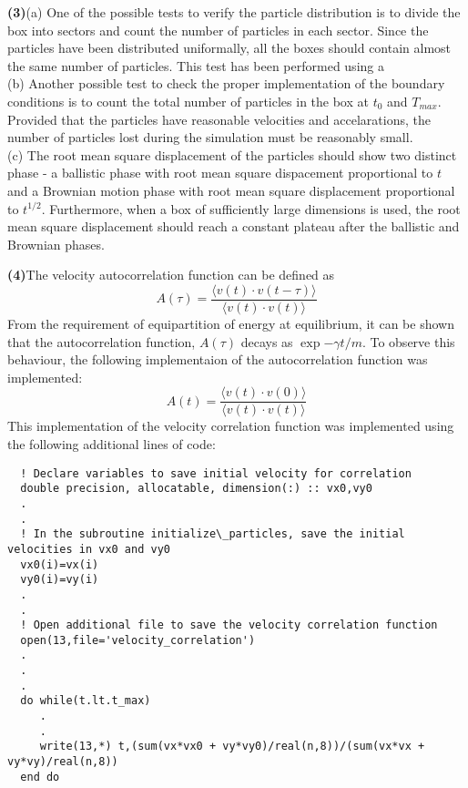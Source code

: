 \documentclass[11pt, oneside]{article}
\begin{document}
\textbf{(3)}\quad (a) One of the possible tests to verify the particle distribution is to divide the box into sectors and count the number of particles in each sector. Since the particles have been distributed uniformally, all the boxes should contain almost the same number of particles. This test has been performed using a \\
(b) Another possible test to check the proper implementation of the boundary conditions is to count the total number of particles in the box at \(t_0\) and \(T_{max}\). Provided that the particles have reasonable velocities and accelarations, the number of particles lost during the simulation must be reasonably small.\\ (c) The root mean square displacement of the particles should show two distinct phase - a ballistic phase with root mean square dispacement proportional to \(t\) and a Brownian motion phase with root mean square displacement proportional to \(t^{1/2}\). Furthermore, when a box of sufficiently large dimensions is used, the root mean square displacement should reach a constant plateau after the ballistic and Brownian phases.     

\textbf{(4)}\quad The velocity autocorrelation function can be defined as
\[A(\tau) = \frac{\langle v(t) \cdot v(t-\tau) \rangle}{\langle v(t) \cdot v(t) \rangle}\]
  From the requirement of equipartition of energy at equilibrium, it can be shown that the autocorrelation function, \(A(\tau)\) decays as \(\exp{-\gamma t / m}\). To observe this behaviour, the following implementaion of the autocorrelation function was implemented: \[A(t) = \frac{\langle v(t) \cdot v(0) \rangle}{\langle v(t) \cdot v(t) \rangle}\] This implementation of the velocity correlation function was implemented using the following additional lines of code:

\begin{lstlisting}
  ! Declare variables to save initial velocity for correlation
  double precision, allocatable, dimension(:) :: vx0,vy0
  .
  .
  ! In the subroutine initialize\_particles, save the initial velocities in vx0 and vy0
  vx0(i)=vx(i)
  vy0(i)=vy(i)
  .
  .
  ! Open additional file to save the velocity correlation function
  open(13,file='velocity_correlation')
  .
  .
  .
  do while(t.lt.t_max)
     .
     .
     write(13,*) t,(sum(vx*vx0 + vy*vy0)/real(n,8))/(sum(vx*vx + vy*vy)/real(n,8))
  end do
\end{lstlisting}     
\end{document}

